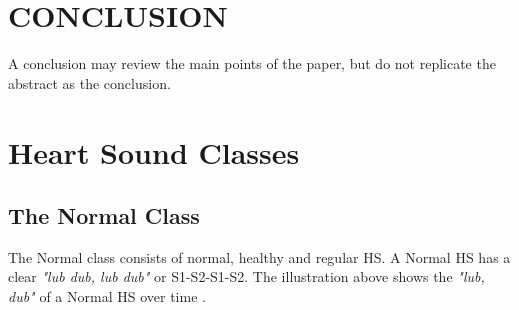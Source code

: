 \documentclass[10pt,twocolumn]{witseiepaper}
\begin{document}
\newpage
\section{CONCLUSION}

A conclusion may review the main points of the paper, but do not replicate the
abstract as the conclusion.




%








\appendix
\section{Heart Sound Classes}
\label{HS}

\subsection*{The Normal Class}
The Normal class consists of normal, healthy and regular HS. A Normal HS has a clear \textit{"lub dub, lub dub"} or S1-S2-S1-S2. The illustration above shows the \textit{"lub, dub"} of a Normal HS over time \cite{bentley}.

\end{document}

